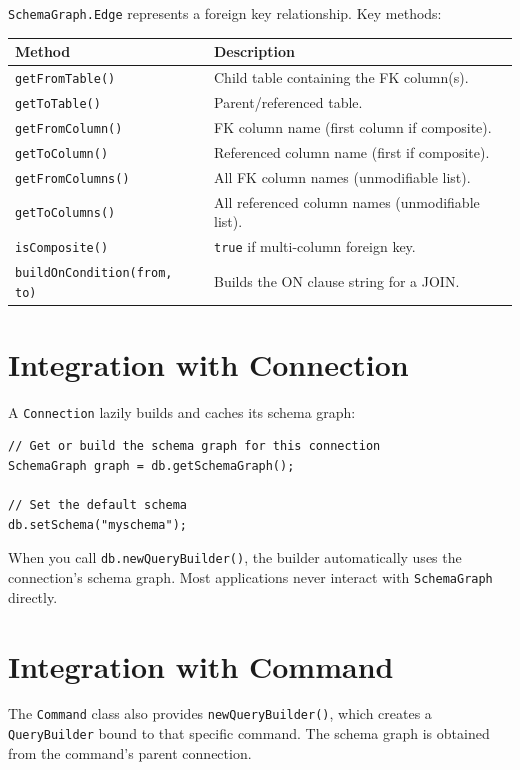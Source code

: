 \texttt{SchemaGraph.Edge} represents a foreign key relationship.  Key methods:

\begin{longtable}{P{4.8cm}P{5.7cm}}
\toprule
\textbf{Method} & \textbf{Description} \\
\midrule
\endhead
\texttt{getFromTable()} & Child table containing the FK column(s). \\
\texttt{getToTable()} & Parent/referenced table. \\
\texttt{getFromColumn()} & FK column name (first column if composite). \\
\texttt{getToColumn()} & Referenced column name (first if composite). \\
\texttt{getFromColumns()} & All FK column names (unmodifiable list). \\
\texttt{getToColumns()} & All referenced column names (unmodifiable list). \\
\texttt{isComposite()} & \texttt{true} if multi-column foreign key. \\
\texttt{buildOnCondition(from, to)} & Builds the ON clause string for a JOIN. \\
\bottomrule
\end{longtable}

\section{Integration with Connection}
\label{sec:sg-connection}

A \texttt{Connection} lazily builds and caches its schema graph:

\begin{lstlisting}[style=java]
// Get or build the schema graph for this connection
SchemaGraph graph = db.getSchemaGraph();

// Set the default schema
db.setSchema("myschema");
\end{lstlisting}

\noindent
When you call \texttt{db.newQueryBuilder()}, the builder automatically uses the connection's schema graph.  Most applications never interact with \texttt{SchemaGraph} directly.

\section{Integration with Command}
\label{sec:sg-command}

The \texttt{Command} class also provides \texttt{newQueryBuilder()}, which creates a \texttt{QueryBuilder} bound to that specific command.  The schema graph is obtained from the command's parent connection.

